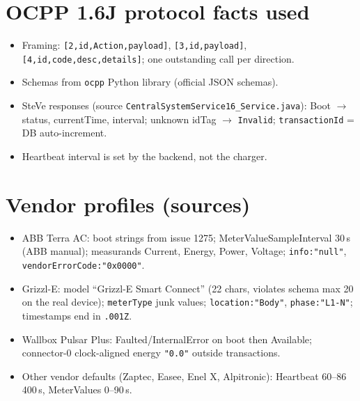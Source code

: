 \documentclass[11pt]{article}
\begin{document}
\section{OCPP 1.6J protocol facts used}
\begin{itemize}
  \item Framing: \texttt{[2,id,Action,payload]}, \texttt{[3,id,payload]}, \texttt{[4,id,code,desc,details]}; one outstanding call per direction.
  \item Schemas from \texttt{ocpp} Python library (official JSON schemas).
  \item SteVe responses (source \texttt{CentralSystemService16\_Service.java}): Boot $\to$ status, currentTime, interval; unknown idTag $\to$ \texttt{Invalid}; \texttt{transactionId} = DB auto-increment.
  \item Heartbeat interval is set by the backend, not the charger.
\end{itemize}

\section{Vendor profiles (sources)}
\begin{itemize}
  \item ABB Terra AC: boot strings from issue 1275; MeterValueSampleInterval 30\,s (ABB manual); measurands Current, Energy, Power, Voltage; \texttt{info:"null"}, \texttt{vendorErrorCode:"0x0000"}.
  \item Grizzl-E: model ``Grizzl-E Smart Connect'' (22 chars, violates schema max 20 on the real device); \texttt{meterType} junk values; \texttt{location:"Body"}, \texttt{phase:"L1-N"}; timestamps end in \texttt{.001Z}.
  \item Wallbox Pulsar Plus: Faulted/InternalError on boot then Available; connector-0 clock-aligned energy \texttt{"0.0"} outside transactions.
  \item Other vendor defaults (Zaptec, Easee, Enel X, Alpitronic): Heartbeat 60--86\,400\,s, MeterValues 0--90\,s.
\end{itemize}
\end{document}
